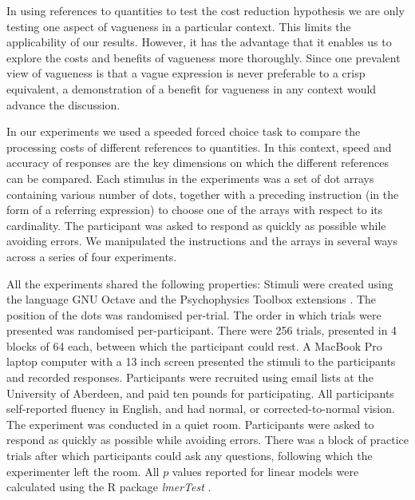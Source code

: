 \documentclass[%
man,		%
floatsintext,%
apacite%
]{apa6}
\begin{document}
In using references to quantities to test the cost reduction hypothesis we are only testing one aspect of vagueness in a particular context. 
This limits the applicability of our results. 
However, it has the advantage that it enables us to explore the costs and benefits of vagueness more thoroughly. 
Since one prevalent view of vagueness is that a vague expression is never preferable to a crisp equivalent, a demonstration of a benefit for vagueness in any context would advance the discussion.

In our experiments we used a speeded forced choice task to compare the processing costs of different references to quantities. 
In this context, speed and accuracy of responses are the key dimensions on which the different references can be compared. 
Each stimulus in the experiments was a set of dot arrays containing various number of dots, together with a preceding instruction (in the form of a referring expression) to choose one of the arrays with respect to its cardinality.
The participant was asked to respond as quickly as possible while avoiding errors. 
We manipulated the instructions and the arrays in several ways across a series of four experiments. 

All the experiments shared the following properties: 
Stimuli were created using the language GNU Octave \cite{eaton:2002} and the Psychophysics Toolbox extensions \cite{ptbx1, ptbx2}.
The position of the dots was randomised per-trial.
The order in which trials were presented was randomised per-participant. 
There were 256 trials, presented in 4 blocks of 64 each, between which the participant could rest. 
A MacBook Pro laptop computer with a 13 inch screen presented the stimuli to the participants and recorded responses. 
Participants were recruited using email lists at the University of Aberdeen, and paid ten pounds for participating.
All participants self-reported fluency in English, and had normal, or corrected-to-normal vision.
The experiment was conducted in a quiet room. 
Participants were asked to respond as quickly as possible while avoiding errors.
There was a block of practice trials after which participants could ask any questions, following which the experimenter left the room.
All $p$ values reported for linear models were calculated using the R package \emph{lmerTest} \cite{lmerTest}.

\end{document}
